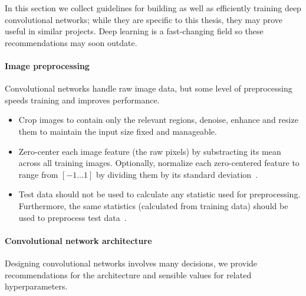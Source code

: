 In this section we collect guidelines for building as well as efficiently training deep convolutional networks; while they are specific to this thesis, they may prove useful in similar projects. Deep learning is a fast-changing field so these recommendations may soon outdate.

\paragraph{Image preprocessing} Convolutional networks handle raw image data, but some level of preprocessing speeds training and improves performance.
\begin{itemize}
	\item Crop images to contain only the relevant regions, denoise, enhance and resize them to maintain the input size fixed and manageable.

	\item Zero-center each image feature (the raw pixels) by substracting its mean across all training images. Optionally, normalize each zero-centered feature to range from $[-1 \dots 1]$ by dividing them by its standard deviation~\cite{Karpathy2015}.

	\item Test data should not be used to calculate any statistic used for preprocessing. Furthermore, the same statistics (calculated from training data) should be used to preprocess test data~\cite{Karpathy2015}.
\end{itemize}



\paragraph{Convolutional network architecture} Designing convolutional networks involves many decisions, we provide recommendations for the architecture and sensible values for related hyperparameters.

